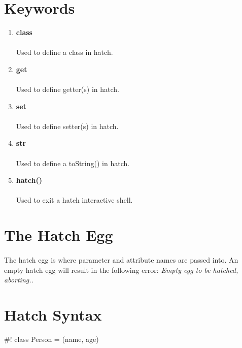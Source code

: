 \documentclass[12pt]{article}
\begin{document}
\section{Keywords}
\begin{enumerate}
\item{\textbf{class}}
\paragraph{}Used to define a class in hatch.
\item{\textbf{get}}
\paragraph{}Used to define getter(s) in hatch.
\item{\textbf{set}}
\paragraph{}Used to define setter(s) in hatch.
\item{\textbf{str}}
\paragraph{}Used to define a toString() in hatch.
\item{\textbf{hatch()}}
\paragraph{}Used to exit a hatch interactive shell.
\end{enumerate}

\section{The Hatch Egg}
\paragraph{}The hatch egg is where parameter and attribute names are passed into.  An empty hatch egg will result in the following error: \textit{Empty egg to be hatched, aborting..}

\section{Hatch Syntax}
\begin{center}
\#! class Person = (name, age)
\end{center}
\end{document}
